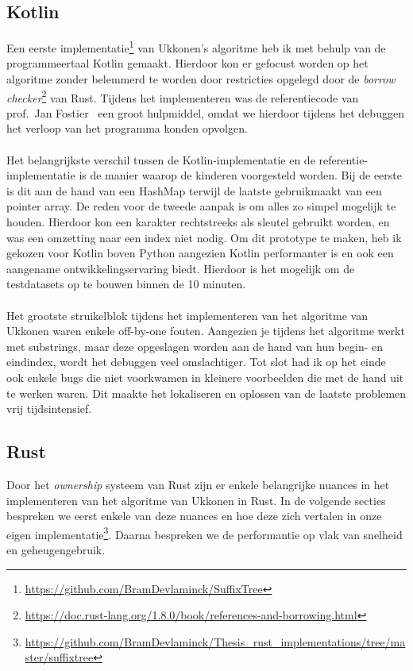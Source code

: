 \subsection{Kotlin}\label{subsec:kotlin}
Een eerste implementatie\footnote{\url{https://github.com/BramDevlaminck/SuffixTree}} van Ukkonen's algoritme heb ik met behulp van de programmeertaal Kotlin gemaakt.
Hierdoor kon er gefocust worden op het algoritme zonder belemmerd te worden door restricties opgelegd door de \textit{borrow checker}\footnote{\url{https://doc.rust-lang.org/1.8.0/book/references-and-borrowing.html}} van Rust.
Tijdens het implementeren was de referentiecode van prof.~Jan Fostier~\cite{Ukkonen_CCB} een groot hulpmiddel, omdat we hierdoor tijdens het debuggen het verloop van het programma konden opvolgen.
\\ \\
Het belangrijkste verschil tussen de Kotlin-implementatie en de referentie-implementatie is de manier waarop de kinderen voorgesteld worden.
Bij de eerste is dit aan de hand van een HashMap terwijl de laatste gebruikmaakt van een pointer array.
De reden voor de tweede aanpak is om alles zo simpel mogelijk te houden.
Hierdoor kon een karakter rechtstreeks als sleutel gebruikt worden, en was een omzetting naar een index niet nodig.
Om dit prototype te maken, heb ik gekozen voor Kotlin boven Python aangezien Kotlin performanter is en ook een aangename ontwikkelingservaring biedt.
Hierdoor is het mogelijk om de testdatasets op te bouwen binnen de 10 minuten.
\\ \\
Het grootste struikelblok tijdens het implementeren van het algoritme van Ukkonen waren enkele off-by-one fouten.
Aangezien je tijdens het algoritme werkt met substrings, maar deze opgeslagen worden aan de hand van hun begin- en eindindex, wordt het debuggen veel omslachtiger.
Tot slot had ik op het einde ook enkele bugs die niet voorkwamen in kleinere voorbeelden die met de hand uit te werken waren.
Dit maakte het lokaliseren en oplossen van de laatste problemen vrij tijdsintensief.

\subsection{Rust}\label{subsec:rust}
Door het \textit{ownership} systeem van Rust zijn er enkele belangrijke nuances in het implementeren van het algoritme van Ukkonen in Rust.
In de volgende secties bespreken we eerst enkele van deze nuances en hoe deze zich vertalen in onze eigen implementatie\footnote{\url{https://github.com/BramDevlaminck/Thesis_rust_implementations/tree/master/suffixtree}}.
Daarna bespreken we de performantie op vlak van snelheid en geheugengebruik.

